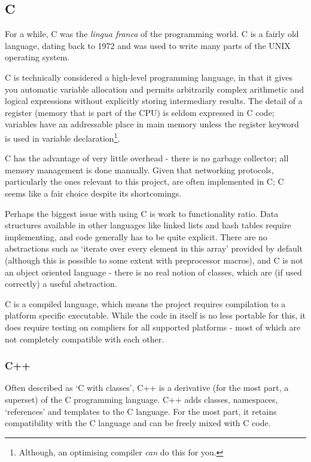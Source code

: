 \documentclass[10pt,a4paper,notitlepage]{report}
\begin{document}
\subsection{C}
For a while, C was the \emph{lingua franca} of the programming world. C is a fairly old language, dating back to 1972 and was used to write many parts of the UNIX operating system\cite{tcpl}.

C is technically considered a high-level programming language, in that it gives you automatic variable allocation and permits arbitrarily complex arithmetic and logical expressions without explicitly storing intermediary results. The detail of a register (memory that is part of the CPU) is seldom expressed in C code; variables have an addressable place in main memory unless the register keyword is used in variable declaration\footnote{Although, an optimising compiler \emph{can} do this for you.}.

C has the advantage of very little overhead - there is no garbage collector; all memory management is done manually. Given that networking protocols, particularly the ones relevant to this project, are often implemented in C; C seems like a fair choice despite its shortcomings.

Perhaps the biggest issue with using C is work to functionality ratio. Data structures available in other languages like linked lists and hash tables require implementing, and code generally has to be quite explicit. There are no abstractions such as `iterate over every element in this array' provided by default (although this is possible to some extent with preprocessor macros), and C is not an object oriented language - there is no real notion of classes, which are (if used correctly) a useful abstraction.

C is a compiled language, which means the project requires compilation to a platform specific executable. While the code in itself is no less portable for this, it does require testing on compliers for all supported platforms - most of which are not completely compatible with each other.

\subsubsection{C++}
Often described as `C with classes', C++ is a derivative (for the most part, a superset) of the C programming language\cite{tcpppl}.
C++ adds classes, namespaces, `references' and templates to the C language. For the most part, it retains compatibility with the C language and can be freely mixed with C code.
\end{document}
